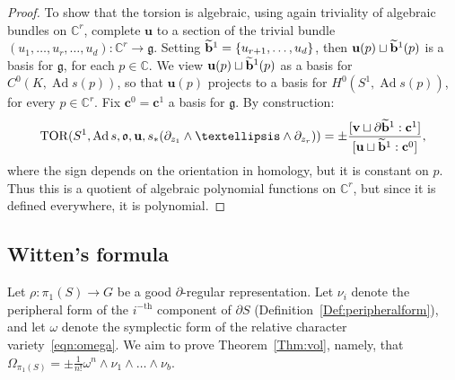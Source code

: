 \documentclass[11pt]{article}
\theoremstyle{definition}
\numberwithin{equation}{section}
\numberwithin{figure}{section}
\numberwithin{table}{section}
\DeclareMathOperator{\TOR}{TOR}
\DeclareMathOperator{\Ad}{Ad}
\newcommand{\Cbb}{\mathbb{C}}
\newcommand{\gfrk}{\mathfrak{g}}
\newcommand{\ofrk}{\mathfrak{o}}
\newcommand{\ubf}{\mathbf{u}}
\newcommand{\vbf}{\mathbf{v}}
\newcommand{\cbf}{\mathbf{c}}
\newcommand{\bbf}{\mathbf{b}}
\newcommand*\bS{b}
\let\oldtilde\tilde
\renewcommand*{\tilde}[1]{\mathchoice{\widetilde{#1}}{\widetilde{#1}}{\oldtilde{#1}}{\oldtilde{#1}}}\let\oldhat\hat
\renewcommand*{\hat}[1]{\mathchoice{\widehat{#1}}{\widehat{#1}}{\oldhat{#1}}{\oldhat{#1}}}\let\oldforall\forall
\renewcommand*{\forall}{\mathrel{\oldforall}}
\begin{document}
\begin{proof}
To show that the torsion is algebraic, using again triviality of algebraic bundles on $\Cbb^r$, complete $\ubf$ to a section of the trivial bundle $(u_1,\dotsc,u_r,\dotsc, u_{d})\colon \Cbb^r \to\gfrk $. Setting $\tilde {\bbf}^1=\{u_{r+1},\dotsc,u_{d}\}$, then $\ubf(p)\sqcup \tilde {\bbf}^1(p)$ is a basis for $\gfrk$, for each $p\in \Cbb$. We view $\ubf(p)\sqcup \tilde {\bbf}^1(p)$ as a basis for $ C^0(K,\Ad s(p))$, so that $\ubf(p)$ projects to a basis for $H^0(S^1,\Ad s(p))$, for every $p\in\Cbb^r$. Fix $\cbf^0=\cbf^1$ a basis for $\gfrk$. By construction:
\[
\TOR(S^1,\Ad s, \ofrk, \ubf,s_*(\partial_{z_1}\wedge\dots\wedge \partial_{z_r})) =
\pm \frac {[\vbf \sqcup \partial \tilde {\bbf}^1 : \cbf^1]}{[\ubf \sqcup \tilde {\bbf}^1 : \cbf^0]},
\]
where the sign depends on the orientation in homology, but it is constant on $p$. Thus this is a quotient of algebraic polynomial functions on $\Cbb^r$, but since it is defined everywhere, it is polynomial.
\end{proof}



\subsection{Witten's formula}

Let $\rho\colon\pi_1(S)\to G$ be a good $\partial$-regular representation. Let $\nu_i$ denote the peripheral form of the $i^{-\text{th}}$ component of $\partial S$ (Definition~\ref{Def:peripheralform}), and let $\omega$ denote the symplectic form of the relative character variety~\eqref{eqn:omega}. We aim to prove Theorem~\ref{Thm:vol}, namely, that $
\Omega_{\pi_1(S)}=\pm \frac{1}{n!}\omega^{n}\wedge \nu_1\wedge\dots\wedge\nu_\bS $.
\end{document}
